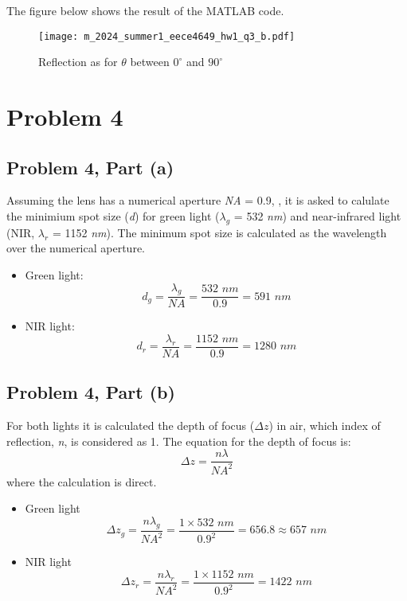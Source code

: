 \documentclass[12pt]{article}
\begin{document}
The figure below shows the result of the MATLAB code.
\begin{figure}[H]
    \centering
    \texttt{[image: m\_2024\_summer1\_eece4649\_hw1\_q3\_b.pdf]}
    \caption{Reflection as for $\theta$ between \(0^\circ\) and \(90^\circ\)}
    \label{fig:reflection}
\end{figure}


\newpage
\section*{Problem 4}
\subsection*{Problem 4, Part (a)}
Assuming the lens has a numerical aperture \textit{NA} = 0.9, , it is asked to calulate the minimium spot size (\textit{d}) for green light ($\lambda_g$ = 532 \textit{ nm}) and near-infrared light (NIR, $\lambda_r$ = 1152 \textit{ nm}).
The minimum spot size is calculated as the wavelength over the numerical aperture.
\begin{itemize}
    \item Green light:
\[
d_g = \frac{\lambda_g}{NA} = \frac{532 \textit{ nm}}{0.9} = 591 \textit{ nm}
\]
    \item NIR light:
\[
d_r = \frac{\lambda_r}{NA} = \frac{1152 \textit{ nm}}{0.9} = 1280 \textit{ nm}
\]
\end{itemize}
\subsection*{Problem 4, Part (b)}
For both lights it is calculated the depth of focus ($\Delta z$) in air, which index of reflection, \textit{n}, is considered as 1.
The equation for the depth of focus is:
\[
\Delta z = \frac{n \lambda}{{NA}^2}
\]
where the calculation is direct.
\begin{itemize}
    \item Green light
    \[
    \Delta z_g = \frac{n \lambda_g}{{NA}^2} = \frac{1 \times 532 \textit{ nm}}{{0.9}^2} = 656.8 \approx 657 \textit{ nm}
    \]
    \item NIR light
    \[
    \Delta z_r = \frac{n \lambda_r}{{NA}^2} = \frac{1 \times 1152 \textit{ nm}}{{0.9}^2} = 1422 \textit{ nm}
    \]
\end{itemize}
\end{document}
